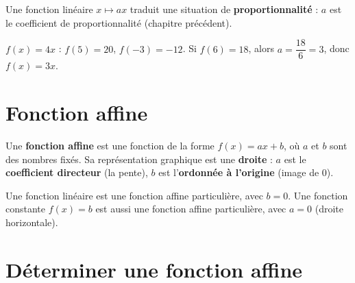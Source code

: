 \begin{propriete}[Proportionnalité]
Une fonction linéaire $x\mapsto ax$ traduit une situation de \textbf{proportionnalité} : $a$
est le coefficient de proportionnalité (chapitre précédent).
\end{propriete}

\begin{exemple}
$f(x)=4x$ : $f(5)=20$, $f(-3)=-12$. Si $f(6)=18$, alors $a=\dfrac{18}6=3$, donc
$f(x)=3x$.
\end{exemple}

\section{Fonction affine}

\begin{definition}
Une \textbf{fonction affine} est une fonction de la forme $f(x)=ax+b$, où $a$ et $b$ sont
des nombres fixés. Sa représentation graphique est une \textbf{droite} : $a$ est le
\textbf{coefficient directeur} (la pente), $b$ est l'\textbf{ordonnée à l'origine} (image de
$0$).
\end{definition}

\begin{illus}
\end{illus}

\begin{remarque}
Une fonction linéaire est une fonction affine particulière, avec $b=0$. Une fonction
constante $f(x)=b$ est aussi une fonction affine particulière, avec $a=0$ (droite
horizontale).
\end{remarque}

\section{Déterminer une fonction affine}

